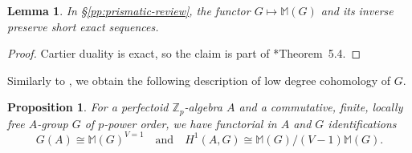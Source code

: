 \documentclass[11pt, reqno]{amsart}
\newcommand{\kestutis}[1]{{\color{Plum} \sf \it{ {\scriptsize ``#1''} }}}
\newcommand{\bM}{\mathbb{M}}
\newcommand{\bZ}{\mathbb{Z}}
\providecommand{\uref}[1]{{\upshape\ref{#1}}}
\providecommand{\uS}{{\upshape\S}}
\newcommand{\blem}{\begin{lemma}}
\newcommand{\elem}{\end{lemma}}
\providecommand{\qxq}[1]{\quad\text{#1}\quad}
\newcommand{\tst}{\textstyle}
\newcommand{\bpf}{\begin{proof}}
\newcommand{\epf}{\end{proof}}
\newcommand{\bprop}{\begin{prop}}
\newcommand{\eprop}{\end{prop}}
\numberwithin{equation}{numberingbase}
\theoremstyle{thms}
\newtheorem{lemma}[numberingbase]{Lemma}
\newtheorem{prop}[numberingbase]{Proposition}
\theoremstyle{claims}
\theoremstyle{defs}
\theoremstyle{thms}
\theoremstyle{defs}
\theoremstyle{subsection-tweak}
\theoremstyle{subsection-tweak}
\begin{document}
\blem \label{MG-exact-2}
In \uS\uref{pp:prismatic-review}, the functor $G \mapsto \bM(G)$ and its inverse preserve short exact sequences. 
\elem

\bpf
Cartier duality is exact, so the claim is part of \cite{ALB20}*{Theorem~5.4}. %
\epf





Similarly to , we obtain the following description of low degree cohomology of $G$.
%

\bprop \label{Hom-Ext-describe}
For a perfectoid $\bZ_p$-algebra $A$ and a commutative, finite, locally free $A$-group $G$ of $p$-power order, we have  functorial in $A$ and $G$ identifications
\begin{equation} \label{MG-fixed-pts}
\tst   G(A) \cong \bM(G)^{V = 1} \qxq{and} H^1(A, G) \cong \bM(G)/(V - 1)\bM(G). 
\end{equation}
\eprop
\end{document}
